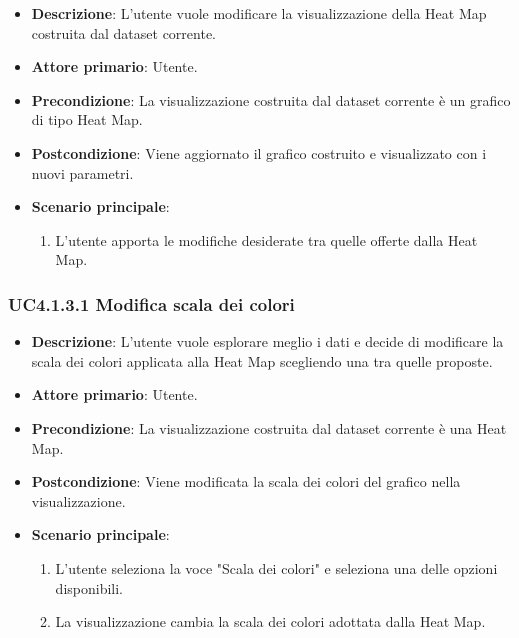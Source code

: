 \begin{itemize}
    \item \textbf{Descrizione}: L’utente vuole modificare la visualizzazione della Heat Map
                                costruita dal dataset corrente.
	
    \item \textbf{Attore primario}: Utente.
    
    \item \textbf{Precondizione}:   La visualizzazione costruita dal dataset corrente è un grafico di tipo Heat Map.

    \item \textbf{Postcondizione}:  Viene aggiornato il grafico costruito e visualizzato con i nuovi parametri.

	\item \textbf{Scenario principale}:
		\begin{enumerate}
            \item L'utente apporta le modifiche desiderate tra quelle offerte dalla Heat Map.
        \end{enumerate}
\end{itemize}

\subsubsection{UC4.1.3.1 Modifica scala dei colori}
\label{subsec:uc4.1.3.1}
\begin{itemize}
    \item \textbf{Descrizione}: L’utente vuole esplorare meglio i dati e decide di 
                                modificare la scala dei colori applicata alla Heat Map scegliendo una 
                                tra quelle proposte.
	
    \item \textbf{Attore primario}: Utente.
    
    \item \textbf{Precondizione}:   La visualizzazione costruita dal dataset corrente è una Heat Map.
    \item \textbf{Postcondizione}:  Viene modificata la scala dei colori del grafico nella visualizzazione.

	\item \textbf{Scenario principale}:
        \begin{enumerate}
            \item L'utente seleziona la voce "Scala dei colori" e seleziona una delle opzioni disponibili.
            \item La visualizzazione cambia la scala dei colori adottata dalla Heat Map.
        \end{enumerate}
\end{itemize}

